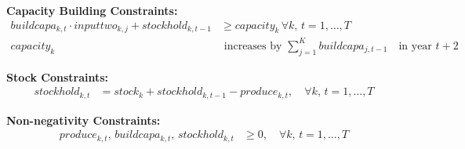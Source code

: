 \documentclass{article}
\begin{document}
\textbf{Capacity Building Constraints:}
\begin{align*}
buildcapa_{k,t} \cdot inputtwo_{k,j} + stockhold_{k,t-1} &\geq capacity_k \, \forall k, \, t = 1,\ldots,T \\
capacity_{k} &\text{ increases by } \sum_{j=1}^{K} buildcapa_{j,t-1} \quad \text{in year } t+2
\end{align*}

\textbf{Stock Constraints:}
\begin{align*}
stockhold_{k,t} &= stock_k + stockhold_{k,t-1} - produce_{k,t}, \quad \forall k, \, t = 1,\ldots,T
\end{align*}

\textbf{Non-negativity Constraints:}
\begin{align*}
produce_{k,t},\, buildcapa_{k,t},\, stockhold_{k,t} &\geq 0, \quad \forall k, \, t = 1,\ldots,T
\end{align*}
\end{document}
